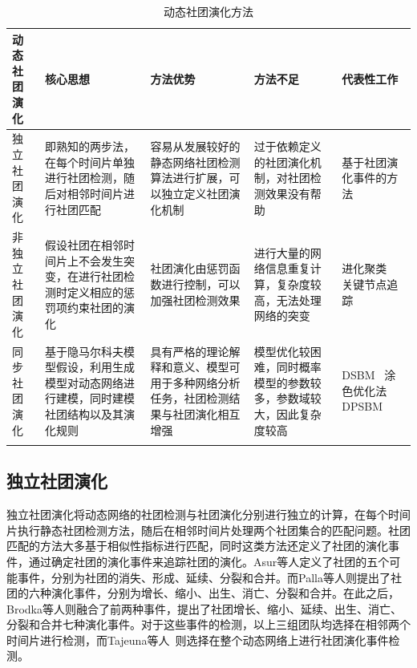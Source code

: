 \begin{table}[htbp]
	\centering
	\caption{动态社团演化方法}
	\begin{tabular}[width=\textwidth]{lp{3cm}p{2.5cm}p{2.5cm}p{2cm}}
		\hline
		动态社团演化&核心思想&方法优势&方法不足&代表性工作\\
		\hline  %
		独立社团演化&即熟知的两步法，在每个时间片单独进行社团检测，随后对相邻时间片进行社团匹配&容易从发展较好的静态网络社团检测算法进行扩展，可以独立定义社团演化机制&过于依赖定义的社团演化机制，对社团检测效果没有帮助& 基于社团演化事件的方法~\cite{asur2009an,palla2007quantifying,brodka2013ged} \\
		非独立社团演化&假设社团在相邻时间片上不会发生突变，在进行社团检测时定义相应的惩罚项约束社团的演化&社团演化由惩罚函数进行控制，可以加强社团检测效果&进行大量的网络信息重复计算，复杂度较高，无法处理网络的突变&进化聚类~\cite{jutla2011generalized,liu2018global,folino2014evolutionary}  关键节点追踪~\cite{gao2016evolutionary}\\
		同步社团演化&基于隐马尔科夫模型假设，利用生成模型对动态网络进行建模，同时建模社团结构以及其演化规则&具有严格的理论解释和意义、模型可用于多种网络分析任务，社团检测结果与社团演化相互增强&模型优化较困难，同时概率模型的参数较多，参数域较大，因此复杂度较高&DSBM~\cite{yang2011detecting} 涂色优化法~\cite{tantipathananandh2011finding} DPSBM~\cite{wu2019dynamic}\\
		\hline %
		
		\label{tab.2.2}
	\end{tabular}
	
\end{table}

\subsection{独立社团演化}

独立社团演化将动态网络的社团检测与社团演化分别进行独立的计算，在每个时间片执行静态社团检测方法，随后在相邻时间片处理两个社团集合的匹配问题。社团匹配的方法大多基于相似性指标进行匹配，同时这类方法还定义了社团的演化事件，通过确定社团的演化事件来追踪社团的演化。Asur等人\cite{asur2009an}定义了社团的五个可能事件，分别为社团的消失、形成、延续、分裂和合并。而Palla等人\cite{palla2007quantifying}则提出了社团的六种演化事件，分别为增长、缩小、出生、消亡、分裂和合并。在此之后，Brodka等人\cite{brodka2013ged}则融合了前两种事件，提出了社团增长、缩小、延续、出生、消亡、分裂和合并七种演化事件。对于这些事件的检测，以上三组团队均选择在相邻两个时间片进行检测，而Tajeuna等人~\cite{tajeuna2015tracking}则选择在整个动态网络上进行社团演化事件检测。

